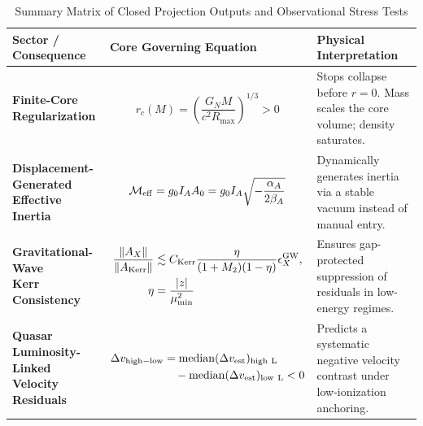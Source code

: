 \documentclass[11pt]{article}
\newcommand{\Kerr}{\mathrm{Kerr}}
\begin{document}
\begin{table}[H]
\centering
\caption{Summary Matrix of Closed Projection Outputs and Observational Stress Tests}
\label{tab:projection_summary}
\small
\begin{tabular}{p{5.0cm} p{6.2cm} p{5.5cm}}
\hline
\textbf{Sector / Consequence} & \textbf{Core Governing Equation} & \textbf{Physical Interpretation} \\ \hline
\raggedright \textbf{Finite-Core\\Regularization} & 
\vspace{-1em} \begin{equation*} r_c(M) = \left( \frac{G_NM}{c^2R_{\max}} \right)^{1/3} >0 \end{equation*} & 
Stops collapse before $r=0$. Mass scales the core volume; density saturates. \\ \hline

\raggedright \textbf{Displacement-Generated\\Effective Inertia} & 
\vspace{-1em} \begin{equation*} \mathcal M_{\rm eff} = g_0I_AA_0 = g_0I_A\sqrt{- \frac{\alpha_A}{2\beta_A}} \end{equation*} & 
Dynamically generates inertia via a stable vacuum instead of manual entry. \\ \hline

\raggedright \textbf{Gravitational-Wave\\Kerr Consistency} &
\vspace{-1.2em}
\begin{equation*}
\begin{aligned}
\frac{\|A_X\|}{\|A_{\rm Kerr}\|}
&\lesssim C_{\rm Kerr}
\frac{\eta}{(1+M_2)(1-\eta)}\epsilon_X^{\rm GW},\\
\eta&=\frac{|z|}{\mu_{\min}^2}
\end{aligned}
\end{equation*}
& Ensures gap-protected suppression of residuals in low-energy regimes. \\ \hline

\raggedright \textbf{Quasar Luminosity-Linked\\Velocity Residuals} & 
\vspace{-1.2em} \begin{equation*} 
\begin{aligned}
\Delta v_{\rm high-low} &= {\rm median}(\Delta v_{\rm est})_{\rm high\ L} \\
&\quad - {\rm median}(\Delta v_{\rm est})_{\rm low\ L} < 0
\end{aligned}
\end{equation*} & 
Predicts a systematic negative velocity contrast under low-ionization anchoring. \\ \hline


\end{tabular}
\end{table}
\end{document}
